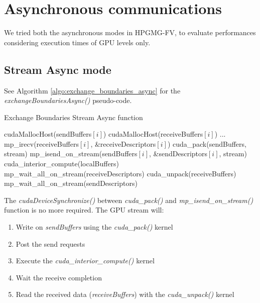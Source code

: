 \documentclass[conference]{IEEEtran}
\begin{document}


\section{Asynchronous communications}\label{sec:gpudirect_async_hpgmg}

We tried both the asynchronous modes in HPGMG-FV, to evaluate performances considering execution times of GPU levels only.

\subsection{Stream Async mode}

See Algorithm \ref{algo:exchange_boundaries_async} for the \textit{exchangeBoundariesAsync()} pseudo-code.

\begin{algorithm}
\small
\caption{Exchange Boundaries Stream Async function}
\label{algo:exchange_boundaries_async}
\begin{algorithmic}[1]
\State cudaMallocHost(sendBuffers$[i]$)
\State cudaMallocHost(receiveBuffers$[i]$)
\EndFor
\State ...
 \label{alg:b}
		\State mp\_irecv(receiveBuffers$[i]$, \&receiveDescriptors$[i]$)    
	\EndFor
	\State cuda\_pack(sendBuffers, stream)
		\State mp\_isend\_on\_stream(sendBuffers$[i]$, \&sendDescriptors$[i]$, stream)    
	\EndFor
	\State cuda\_interior\_compute(localBuffers)
	\State mp\_wait\_all\_on\_stream(receiveDescriptors)
	\State cuda\_unpack(receiveBuffers)
	\State mp\_wait\_all\_on\_stream(sendDescriptors)
\EndFunction
\end{algorithmic}
\end{algorithm}

The \textit{cudaDeviceSynchronize()} between \textit{cuda\_pack()} and \textit{mp\_isend\_on\_stream()} function is no more required. The GPU stream will:

\begin{enumerate}
\item Write on \textit{sendBuffers} using the \textit{cuda\_pack()} kernel
\item Post the send requests
\item Execute the \textit{cuda\_interior\_compute()} kernel
\item Wait the receive completion
\item Read the received data (\textit{receiveBuffers}) with the \textit{cuda\_unpack()} kernel
\end{enumerate}
\end{document}
